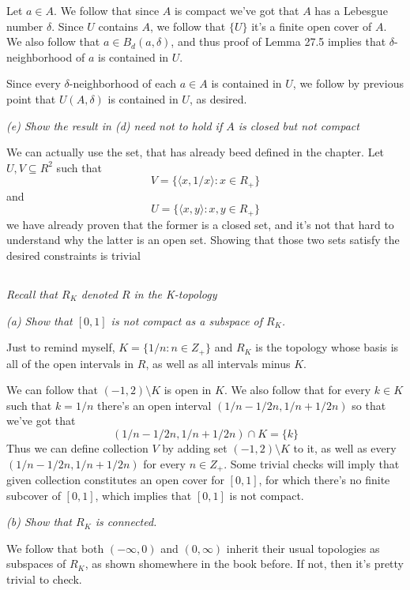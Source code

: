 \documentclass[11pt,oneside,titlepage]{book}
\newcommand{\eangle}[1]{\langle #1 \rangle}
\newcommand{\set}[1]{\{ #1 \}}
\begin{document}
Let $a \in A$. We follow that since $A$ is compact we've got that $A$ has a
Lebesgue number $\delta$. Since $U$ contains $A$, we follow
that $\set{U}$ it's a finite open cover of $A$. We also follow that $a \in B_d(a, \delta)$,
and thus proof of Lemma 27.5 implies that $\delta$-neighborhood of $a$ is contained
in $U$.

Since every $\delta$-neighborhood of each $a \in A$ is contained in $U$, we follow by
previous point that $U(A, \delta)$ is contained in $U$, as desired.

\textit{(e) Show the result in (d) need not to hold if $A$ is closed but not
  compact}

We can actually use the set, that has already beed defined in the chapter. Let $U, V \subseteq R^2$
such that 
$$V = \set{\eangle{x, 1/x}: x \in R_+}$$
and
$$U = \set{\eangle{x, y}: x, y \in R_+}$$
we have already proven that the former is a closed set, and it's not that hard to understand why
the latter is an open set. Showing that those two sets satisfy the desired constraints is trivial

\subsection{}

\textit{Recall that $R_K$ denoted $R$ in the K-topology}

\textit{(a) Show that $[0, 1]$ is not compact as a subspace of $R_K$.}

Just to remind myself, $K = \set{1/n: n \in Z_+}$ and $R_K$ is the topology
whose basis is all of the open intervals in $R$, as well as all intervals minus $K$. 

We can follow that $(-1, 2) \setminus K$ is open in $K$. We also follow that for
every $k \in K$ such that $k = 1/n$ there's an open interval $(1/n - 1/2n, 1/n + 1/2n)$
so that we've got that
$$(1/n - 1/2n, 1/n + 1/2n) \cap K = \set{k}$$
Thus we can define collection $V$ by adding set $(-1, 2) \setminus K$ to it, as well as every
$(1/n - 1/2n, 1/n + 1/2n)$ for every $n \in Z_+$. Some trivial checks will imply that
given collection constitutes an open cover for $[0, 1]$, for which there's no finite
subcover of $[0, 1]$, which implies that $[0, 1]$ is not compact.

\textit{(b) Show that $R_K$ is connected.}

We follow that both $(-\infty, 0)$ and $(0, \infty)$ inherit their usual topologies
as subspaces of $R_K$, as shown shomewhere in the book before. If not, then it's pretty trivial
to check.
\end{document}
